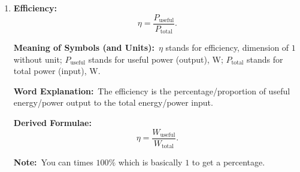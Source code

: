 \documentclass[8pt]{article}
\newcommand{\MeanSymb}{\textbf{Meaning of Symbols (and Units):}\ }
\newcommand{\WordExpl}{\textbf{Word Explanation:}\ }
\newcommand{\DeriForm}{\textbf{Derived Formulae:}\ }
\newcommand{\Note}{\textbf{Note:}\ }
\begin{document}
\begin{enumerate}
                \Note This formula also works for electrical power.

                \item \textbf{Efficiency:}
                \[
                    \eta = \frac{P_{\text{useful}}}{P_{\text{total}}}.
                \]

                \MeanSymb \(\eta\) stands for efficiency, dimension of \(1\) without unit; \(P_{\text{useful}}\) stands for useful power (output), \unit{\watt}; \(P_{\text{total}}\) stands for total power (input), \unit{\watt}.

                \WordExpl The efficiency is the percentage/proportion of useful energy/power output to the total energy/power input.

                \DeriForm
                \[
                    \eta = \frac{W_{\text{useful}}}{W_{\text{total}}}.
                \]

                \Note You can times \(100\%\) which is basically \(1\) to get a percentage.

            \end{enumerate}
\end{document}
